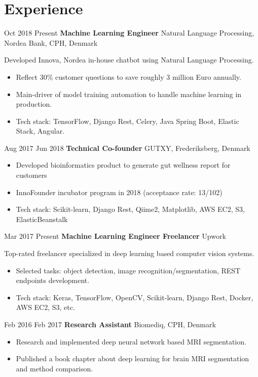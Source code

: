 \documentclass[11pt]{article} %
\begin{document}
{\section{Experience}
\job
{Oct 2018 }{Present}
{\textbf{Machine Learning Engineer}}
{}
{Natural Language Processing, Nordea Bank, CPH, Denmark}
{
	Developed Innova, Nordea in-house chatbot using Natural Language Processing.
    \begin{itemize}
    	\itemsep0em
    	\item Reflect 30\% customer questions to save roughly 3 million Euro annually.
    	\item Main-driver of model training automation to handle machine learning in production.
    	\item Tech stack: TensorFlow, Django Rest, Celery, Java Spring Boot, Elastic Stack, Angular. 
    \end{itemize}
}
\job
{Aug 2017 }{Jun 2018}
{\textbf{Technical Co-founder}}
{}
{GUTXY, Frederiksberg, Denmark}
{
 	\begin{itemize}
		\itemsep0em
		\item Developed bioinformatics product to generate gut wellness report for customers  
		\item InnoFounder incubator program in 2018 (acceptance rate: 13/102)
		\item Tech stack: Scikit-learn, Django Rest, Qiime2, Matplotlib, AWS EC2, S3, ElasticBeanstalk
	\end{itemize}

}
\job
{Mar 2017 }{Present}
{\textbf{Machine Learning Engineer Freelancer}}
{}
{Upwork}
{
	Top-rated freelancer specialized in deep learning based computer vision systems.
 	\begin{itemize}
		\itemsep0em
		\item Selected tasks: object detection, image recognition/segmentation, REST endpoints development.
		\item Tech stack: Keras, TensorFlow, OpenCV, Scikit-learn, Django Rest, Docker, AWS EC2, S3, etc.
	\end{itemize}
}
\job
{Feb 2016 }{Feb 2017}
{\textbf{Research Assistant}}
{}
{Biomediq, CPH, Denmark}
{
 	\begin{itemize}
		\itemsep0em
		\item Research and implemented deep neural network based MRI segmentation.
		\item Published a book chapter about deep learning for brain MRI segmentation and method comparison.
	\end{itemize}

}}
\end{document}

